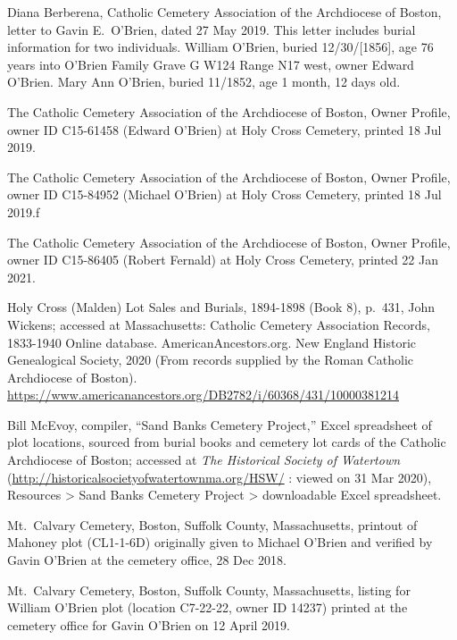 \begin{thebibliography}{99}

Diana Berberena, Catholic Cemetery Association of the Archdiocese of Boston, letter to Gavin E.\ O'Brien, dated 27 May 2019. This letter includes burial information for two individuals. William O'Brien, buried 12/30/[1856], age 76 years into O'Brien Family Grave G W124 Range N17 west, owner Edward O'Brien. Mary Ann O'Brien, buried 11/1852, age 1 month, 12 days old.

The Catholic Cemetery Association of the Archdiocese of Boston, Owner Profile, owner ID C15-61458 (Edward O'Brien) at Holy Cross Cemetery, printed 18 Jul 2019.

The Catholic Cemetery Association of the Archdiocese of Boston, Owner Profile, owner ID C15-84952 (Michael O'Brien) at Holy Cross Cemetery, printed 18 Jul 2019.ƒ

The Catholic Cemetery Association of the Archdiocese of Boston, Owner Profile, owner ID C15-86405 (Robert Fernald) at Holy Cross Cemetery, printed 22 Jan 2021.

Holy Cross (Malden) Lot Sales and Burials, 1894-1898 (Book 8), p.\ 431, John Wickens; accessed at Massachusetts: Catholic Cemetery Association Records, 1833-1940 Online database. AmericanAncestors.org. New England Historic Genealogical Society, 2020 (From records supplied by the Roman Catholic Archdiocese of Boston).
\url{https://www.americanancestors.org/DB2782/i/60368/431/10000381214}

Bill McEvoy, compiler, ``Sand Banks Cemetery Project,'' Excel spreadsheet of plot locations, sourced from burial books and cemetery lot cards of the Catholic Archdiocese of Boston; accessed at \textit{The Historical Society of Watertown} (\url{http://historicalsocietyofwatertownma.org/HSW/} : viewed on 31 Mar 2020), Resources > Sand Banks Cemetery Project > downloadable Excel spreadsheet.

Mt.\ Calvary Cemetery, Boston, Suffolk County, Massachusetts, printout of Mahoney plot (CL1-1-6D) originally given to Michael O'Brien and verified by Gavin O'Brien at the cemetery office, 28 Dec 2018.

Mt.\ Calvary Cemetery, Boston, Suffolk County, Massachusetts, listing for William O'Brien plot (location C7-22-22, owner ID 14237) printed at the cemetery office for Gavin O'Brien on 12 April 2019.

\end{thebibliography}
